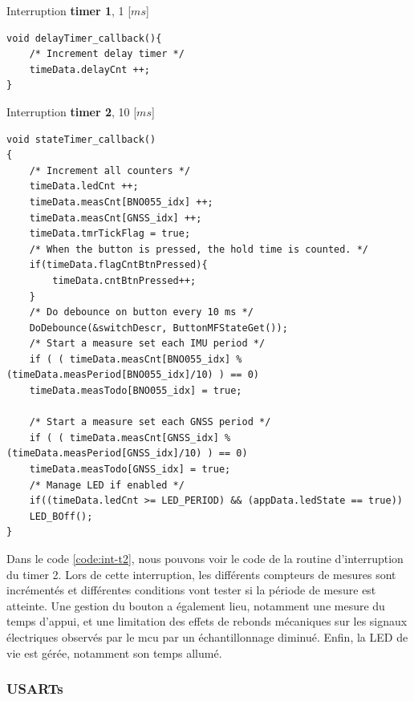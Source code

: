 \clearpage

\begin{code}
\caption{Interruption \textbf{timer 1}, 1 [$ms$]}
\label{code:int-t1}
\vspace*{-3mm}
\begin{verbatim}
void delayTimer_callback(){
	/* Increment delay timer */
	timeData.delayCnt ++;
}
\end{verbatim}
\end{code}

\begin{code}
\caption{Interruption \textbf{timer 2}, 10 [$ms$]}
\label{code:int-t2}
\vspace*{-3mm}
\begin{verbatim}
void stateTimer_callback()
{
	/* Increment all counters */
	timeData.ledCnt ++;
	timeData.measCnt[BNO055_idx] ++;
	timeData.measCnt[GNSS_idx] ++;
	timeData.tmrTickFlag = true;
	/* When the button is pressed, the hold time is counted. */
	if(timeData.flagCntBtnPressed){
		timeData.cntBtnPressed++;
	}
	/* Do debounce on button every 10 ms */
	DoDebounce(&switchDescr, ButtonMFStateGet());
	/* Start a measure set each IMU period */        
	if ( ( timeData.measCnt[BNO055_idx] % (timeData.measPeriod[BNO055_idx]/10) ) == 0)
	timeData.measTodo[BNO055_idx] = true;
	
	/* Start a measure set each GNSS period */        
	if ( ( timeData.measCnt[GNSS_idx] % (timeData.measPeriod[GNSS_idx]/10) ) == 0)
	timeData.measTodo[GNSS_idx] = true;
	/* Manage LED if enabled */
	if((timeData.ledCnt >= LED_PERIOD) && (appData.ledState == true))
	LED_BOff();
} 
\end{verbatim}
\end{code}	

Dans le code \ref{code:int-t2}, nous pouvons voir le code de la routine d'interruption du timer 2. Lors de cette interruption, les différents compteurs de mesures sont incrémentés et différentes conditions vont tester si la période de mesure est atteinte. Une gestion du bouton a également lieu, notamment une mesure du temps d'appui, et une limitation des effets de rebonds mécaniques sur les signaux électriques observés par le \gls{mcu} par un échantillonnage diminué. Enfin, la LED de vie est gérée, notamment son temps allumé.

\clearpage

\subsubsection{USARTs}

